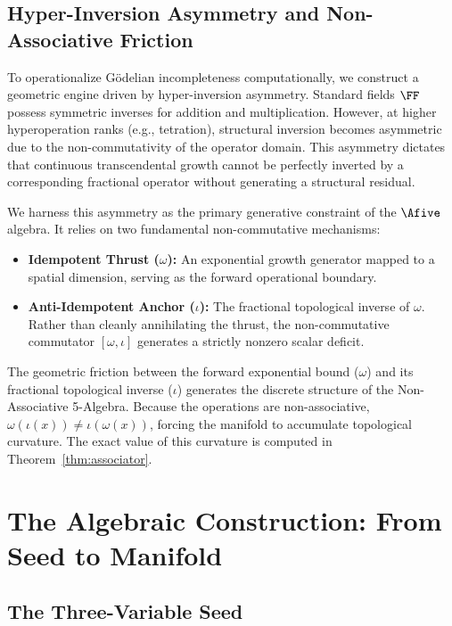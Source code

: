 \subsection{Hyper-Inversion Asymmetry and Non-Associative Friction}

To operationalize G\"odelian incompleteness computationally, we construct a geometric engine driven by hyper-inversion asymmetry. Standard fields $\FF$ possess symmetric inverses for addition and multiplication. However, at higher hyperoperation ranks (e.g., tetration), structural inversion becomes asymmetric due to the non-commutativity of the operator domain. This asymmetry dictates that continuous transcendental growth cannot be perfectly inverted by a corresponding fractional operator without generating a structural residual.

We harness this asymmetry as the primary generative constraint of the $\Afive$ algebra. It relies on two fundamental non-commutative mechanisms:
\begin{itemize}
\item \textbf{Idempotent Thrust ($\omega$):} An exponential growth generator mapped to a spatial dimension, serving as the forward operational boundary.
\item \textbf{Anti-Idempotent Anchor ($\iota$):} The fractional topological inverse of $\omega$. Rather than cleanly annihilating the thrust, the non-commutative commutator $[\omega, \iota]$ generates a strictly nonzero scalar deficit.
\end{itemize}

The geometric friction between the forward exponential bound ($\omega$) and its fractional topological inverse ($\iota$) generates the discrete structure of the Non-Associative 5-Algebra. Because the operations are non-associative, $\omega(\iota(x)) \neq \iota(\omega(x))$, forcing the manifold to accumulate topological curvature. The exact value of this curvature is computed in Theorem~\ref{thm:associator}.

\section{The Algebraic Construction: From Seed to Manifold}

\subsection{The Three-Variable Seed}\label{sec:seed}

